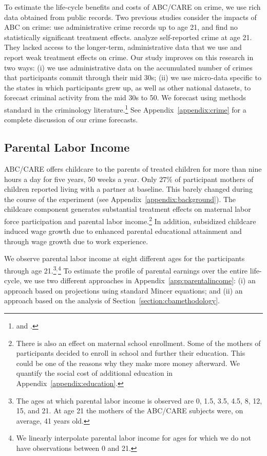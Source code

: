 \noindent To estimate the life-cycle benefits and costs of ABC/CARE on crime, we use rich data obtained from public records. Two previous studies consider the impacts of ABC on crime: \citet{Clarke_Campbell_1998_ABC_Comparison_ECRQ} use administrative crime records up to age 21, and find no statistically significant treatment effects. \cite{Barnett_Masse_2002_benefitcost,Barnett_Masse_2007_EER} analyze self-reported crime at age 21. They lacked access to the longer-term, administrative data that we use and report weak treatment effects on crime. Our study improves on this research in two ways: (i) we use administrative data on the accumulated number of crimes that participants commit through their mid 30s; (ii) we use micro-data specific to the states in which participants grew up, as well as other national datasets, to forecast criminal activity from the mid 30s to 50. We forecast using methods standard in the criminology literature.\footnote{\citet{Cohen-Bowles_2010_Estimating-Cost-Crime} and \citet{McCollister_etal_2010_DAD}.} See Appendix~\ref{appendix:crime} for a complete discussion of our crime forecasts.

\subsection{Parental Labor Income} \label{section:pincome}

\noindent ABC/CARE offers childcare to the parents of treated children for more than nine hours a day for five years, 50 weeks a year. Only $27\%$ of participant mothers of children reported living with a partner at baseline. This barely changed during the course of the experiment (see Appendix~\ref{appendix:background}). The childcare component generates substantial treatment effects on maternal labor force participation and parental labor income.\footnote{There is also an effect on maternal school enrollment. Some of the mothers of participants decided to enroll in school and further their education. This could be one of the reasons why they make more money afterward. We quantify the social cost of additional education in Appendix~\ref{appendix:education}.} In addition, subsidized childcare induced wage growth due to enhanced parental educational attainment and through wage growth due to work experience.

We observe parental labor income at eight different ages for the participants through age 21.\footnote{The ages at which parental labor income is observed are 0, 1.5, 3.5, 4.5, 8, 12, 15, and 21. At age 21 the mothers of the ABC/CARE subjects were, on average, 41 years old.}$^,$\footnote{We linearly interpolate parental labor income for ages for which we do not have observations between 0 and 21.} To estimate the profile of parental earnings over the entire life-cycle, we use two different approaches in Appendix~\ref{app:parentalincome}: (i) an approach based on projections using standard Mincer equations; and (ii) an approach based on the analysis of Section~\ref{section:cbamethodology}.

